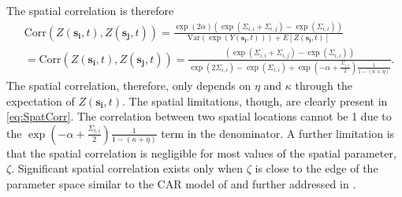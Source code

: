 \documentclass[11pt]{isuthesis}
\begin{document}
The spatial correlation is therefore
\begin{align}
	& \mbox{Corr}(Z(\boldsymbol{s_i},t),Z(\boldsymbol{s_j},t))  = \frac{\exp(2\alpha)\left(\exp(\Sigma_{i,i}+\Sigma_{i,j}) -\exp(\Sigma_{i,i})\right)}{\mbox{Var} (\exp(Y(\boldsymbol{s_i},t)))+E[Z(\boldsymbol{s_i},t)]}\nonumber \\
	&=\mbox{Corr}(Z(\boldsymbol{s_i},t),Z(\boldsymbol{s_j},t))  = \frac{\left(\exp(\Sigma_{i,i}+\Sigma_{i,j}) -\exp(\Sigma_{i,i})\right)}{ \exp(2\Sigma_{i,i})-\exp(\Sigma_{i,i})+\exp(-\alpha+\frac{\Sigma_{i,i}}{2})\frac{1}{1-(\kappa+\eta)}}\label{eq:SpatCorr}.
\end{align}
The spatial correlation, therefore, only depends on $\eta$ and $\kappa$ through the expectation of $Z(\boldsymbol{s_i},t)$.  The spatial limitations, though, are clearly present in \eqref{eq:SpatCorr}.  The correlation between two spatial locations cannot be 1 due to the $\exp(-\alpha+\frac{\Sigma_{i,i}}{2})\frac{1}{1-(\kappa+\eta)}$ term in the denominator.  A further limitation is that the spatial correlation is negligible for most values of the spatial parameter, $\zeta$.  Significant spatial correlation exists only when $\zeta$ is close to the edge of the parameter space similar to the CAR model of \cite{besag1981system} and further addressed in \cite{wall2004close}.
\end{document}
